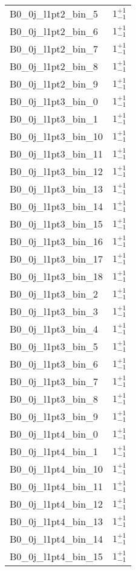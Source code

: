 \begin{tabular}{|l|c|}
B0\_0j\_l1pt2\_bin\_5 & $1^{+1}_{-1}$ \\
B0\_0j\_l1pt2\_bin\_6 & $1^{+1}_{-1}$ \\
B0\_0j\_l1pt2\_bin\_7 & $1^{+1}_{-1}$ \\
B0\_0j\_l1pt2\_bin\_8 & $1^{+1}_{-1}$ \\
B0\_0j\_l1pt2\_bin\_9 & $1^{+1}_{-1}$ \\
B0\_0j\_l1pt3\_bin\_0 & $1^{+1}_{-1}$ \\
B0\_0j\_l1pt3\_bin\_1 & $1^{+1}_{-1}$ \\
B0\_0j\_l1pt3\_bin\_10 & $1^{+1}_{-1}$ \\
B0\_0j\_l1pt3\_bin\_11 & $1^{+1}_{-1}$ \\
B0\_0j\_l1pt3\_bin\_12 & $1^{+1}_{-1}$ \\
B0\_0j\_l1pt3\_bin\_13 & $1^{+1}_{-1}$ \\
B0\_0j\_l1pt3\_bin\_14 & $1^{+1}_{-1}$ \\
B0\_0j\_l1pt3\_bin\_15 & $1^{+1}_{-1}$ \\
B0\_0j\_l1pt3\_bin\_16 & $1^{+1}_{-1}$ \\
B0\_0j\_l1pt3\_bin\_17 & $1^{+1}_{-1}$ \\
B0\_0j\_l1pt3\_bin\_18 & $1^{+1}_{-1}$ \\
B0\_0j\_l1pt3\_bin\_2 & $1^{+1}_{-1}$ \\
B0\_0j\_l1pt3\_bin\_3 & $1^{+1}_{-1}$ \\
B0\_0j\_l1pt3\_bin\_4 & $1^{+1}_{-1}$ \\
B0\_0j\_l1pt3\_bin\_5 & $1^{+1}_{-1}$ \\
B0\_0j\_l1pt3\_bin\_6 & $1^{+1}_{-1}$ \\
B0\_0j\_l1pt3\_bin\_7 & $1^{+1}_{-1}$ \\
B0\_0j\_l1pt3\_bin\_8 & $1^{+1}_{-1}$ \\
B0\_0j\_l1pt3\_bin\_9 & $1^{+1}_{-1}$ \\
B0\_0j\_l1pt4\_bin\_0 & $1^{+1}_{-1}$ \\
B0\_0j\_l1pt4\_bin\_1 & $1^{+1}_{-1}$ \\
B0\_0j\_l1pt4\_bin\_10 & $1^{+1}_{-1}$ \\
B0\_0j\_l1pt4\_bin\_11 & $1^{+1}_{-1}$ \\
B0\_0j\_l1pt4\_bin\_12 & $1^{+1}_{-1}$ \\
B0\_0j\_l1pt4\_bin\_13 & $1^{+1}_{-1}$ \\
B0\_0j\_l1pt4\_bin\_14 & $1^{+1}_{-1}$ \\
B0\_0j\_l1pt4\_bin\_15 & $1^{+1}_{-1}$ \\

\end{tabular}
